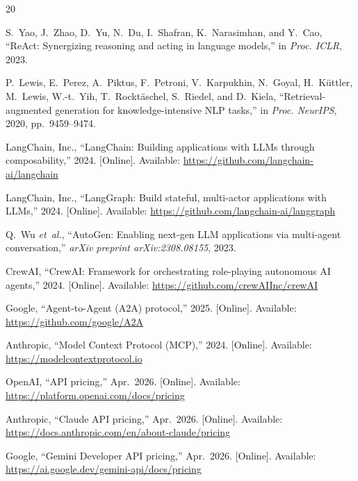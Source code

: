 \documentclass[conference]{IEEEtran}
\begin{document}
\footnotesize
\begin{thebibliography}{20}
\setlength{\itemsep}{1pt plus 0.3ex}

S.~Yao, J.~Zhao, D.~Yu, N.~Du, I.~Shafran, K.~Narasimhan, and Y.~Cao,
``ReAct: Synergizing reasoning and acting in language models,''
in \textit{Proc. ICLR}, 2023.

P.~Lewis, E.~Perez, A.~Piktus, F.~Petroni, V.~Karpukhin, N.~Goyal, H.~K\"{u}ttler, M.~Lewis, W.-t.~Yih, T.~Rockt\"{a}schel, S.~Riedel, and D.~Kiela,
``Retrieval-augmented generation for knowledge-intensive NLP tasks,''
in \textit{Proc. NeurIPS}, 2020, pp.~9459--9474.

LangChain, Inc.,
``LangChain: Building applications with LLMs through composability,''
2024. [Online]. Available: \url{https://github.com/langchain-ai/langchain}

LangChain, Inc.,
``LangGraph: Build stateful, multi-actor applications with LLMs,''
2024. [Online]. Available: \url{https://github.com/langchain-ai/langgraph}

Q.~Wu \textit{et~al.},
``AutoGen: Enabling next-gen LLM applications via multi-agent conversation,''
\textit{arXiv preprint arXiv:2308.08155}, 2023.

CrewAI,
``CrewAI: Framework for orchestrating role-playing autonomous AI agents,''
2024. [Online]. Available: \url{https://github.com/crewAIInc/crewAI}

Google,
``Agent-to-Agent (A2A) protocol,''
2025. [Online]. Available: \url{https://github.com/google/A2A}

Anthropic,
``Model Context Protocol (MCP),''
2024. [Online]. Available: \url{https://modelcontextprotocol.io}

OpenAI,
``API pricing,''
Apr.~2026. [Online]. Available: \url{https://platform.openai.com/docs/pricing}

Anthropic,
``Claude API pricing,''
Apr.~2026. [Online]. Available: \url{https://docs.anthropic.com/en/about-claude/pricing}

Google,
``Gemini Developer API pricing,''
Apr.~2026. [Online]. Available: \url{https://ai.google.dev/gemini-api/docs/pricing}


\end{thebibliography}
\end{document}

